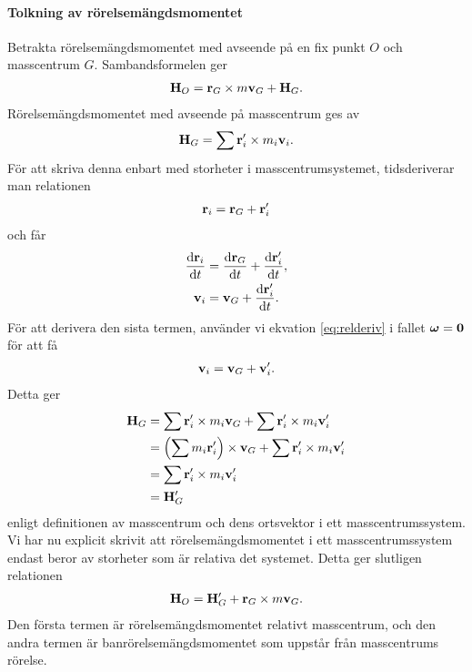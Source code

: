 \paragraph{Tolkning av rörelsemängdsmomentet}
Betrakta rörelsemängdsmomentet med avseende på en fix punkt $O$ och masscentrum $G$. Sambandsformelen ger
\begin{align*}
	\vb{H}_{O} = \vb{r}_{G}\times m\vb{v}_{G} + \vb{H}_{G}.
\end{align*}
Rörelsemängdsmomentet med avseende på masscentrum ges av
\begin{align*}
	\vb{H}_{G} = \sum\vb{r}_{i}'\times m_{i}\vb{v}_{i}.
\end{align*}
För att skriva denna enbart med storheter i masscentrumsystemet, tidsderiverar man relationen
\begin{align*}
	\vb{r}_{i} = \vb{r}_{G} + \vb{r}_{i}'
\end{align*}
och får
\begin{align*}
	\dv{\vb{r}_{i}}{t} &= \dv{\vb{r}_{G}}{t} + \dv{\vb{r}_{i}'}{t}, \\
	\vb{v}_{i}         &= \vb{v}_{G} + \dv{\vb{r}_{i}'}{t}.
\end{align*}
För att derivera den sista termen, använder vi ekvation \ref{eq:relderiv} i fallet $\vb*{\omega} = \vb{0}$ för att få
\begin{align*}
	\vb{v}_{i} = \vb{v}_{G} + \vb{v}_{i}'.
\end{align*}
Detta ger
\begin{align*}
	\vb{H}_{G} &= \sum\vb{r}_{i}'\times m_{i}\vb{v}_{G} + \sum\vb{r}_{i}'\times m_{i}\vb{v}_{i}' \\
	           &= \left(\sum m_{i}\vb{r}_{i}'\right)\times \vb{v}_{G} + \sum\vb{r}_{i}'\times m_{i}\vb{v}_{i}' \\
	           &= \sum\vb{r}_{i}'\times m_{i}\vb{v}_{i}' \\
	           &= \vb{H}_{G}'
\end{align*}
enligt definitionen av masscentrum och dens ortsvektor i ett masscentrumssystem. Vi har nu explicit skrivit att rörelsemängdsmomentet i ett masscentrumssystem endast beror av storheter som är relativa det systemet. Detta ger slutligen relationen
\begin{align*}
	\vb{H}_{O} = \vb{H}_{G}' + \vb{r}_{G}\times m\vb{v}_{G}.
\end{align*}
Den första termen är rörelsemängdsmomentet relativt masscentrum, och den andra termen är banrörelsemängdsmomentet som uppstår från masscentrums rörelse.

